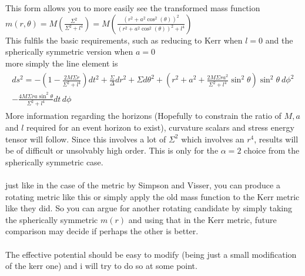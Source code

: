 \documentclass[a4paper,11pt]{article}
\begin{document}
This form allows you to more easily see the transformed mass function $m(r,\theta)=M(\frac{\Sigma^{2}}{\Sigma^{2}+l^4})=M(\frac{(r^2 +a^2\cos^2(\theta))^{2}}{(r^2 +a^2\cos^2(\theta))^{2}+l^4})$ 
\\
\flushleft
This fulfils the basic requirements, such as reducing to Kerr when $l=0$ and the spherically symmetric version when $a=0$
\\
more simply the line element is 
\begin{multline*}
{\displaystyle {\begin{aligned} ds^{2}=-\left(1-{\frac {2M\Sigma r}{\Sigma^{2}+l^4 }}\right)dt^{2}+{\frac {\Sigma }{\Delta }}dr^{2}+\Sigma d\theta ^{2}+\left(r^{2}+a^{2}+{\frac {2M\Sigma ra^{2}}{\Sigma^{2}+l^4 }}\sin ^{2}\theta \right)\sin ^{2}\theta \ d\phi ^{2} &\\ -{\frac {4M\Sigma ra\sin ^{2}\theta }{\Sigma^{2}+l^4 }}dt\,d\phi \end{aligned}}}	
\end{multline*}	
More information regarding the horizons (Hopefully to constrain the ratio of $M,a$ and $l$ required for an event horizon to exist), curvature scalars and stress energy tensor will follow. Since this involves a lot of $\Sigma^2$ which involves an $r^4$, results will be of difficult or unsolvably high order. This is only for the $\alpha = 2$ choice from the spherically symmetric case. 
\\
\\
just like in the case of the metric by Simpson and Visser, you can produce a rotating metric like this or simply apply the old mass function to the Kerr metric like they did. So you can argue for another rotating candidate by simply taking the spherically symmetric $m(r)$ and using that in the Kerr metric, future comparison may decide if perhaps the other is better.
\\
\\
The effective potential should be easy to modify (being just a small modification of the kerr one) and i will try to do so at some point. 
\end{document}
